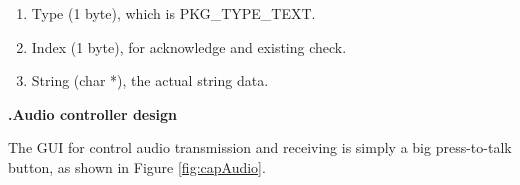 \documentclass[a4paper,notitlepage,10pt]{report}
\newcommand{\tab}{\hspace{0.75cm}}
\newcommand{\fontSubHeading}{\fontsize{10pt}{11pt}\selectfont}
\newcounter{sections}
\newcounter{subsections}[sections]
\begin{document}
\begin{multicols}{2}
\begin{enumerate}[label={\arabic*)},align=left,leftmargin=0.5cm,labelwidth=!,topsep=0pt,partopsep=0pt,parsep=0pt,itemsep=0pt]
\item Type (1 byte), which is PKG\_TYPE\_TEXT.
\item Index (1 byte), for acknowledge and existing check.
\item String (char *), the actual string data.
\end{enumerate}
\vspace{6pt}

\fontSubHeading
{}
\textbf{\thesections.\thesubsections\tab Audio controller design}
\vspace{6pt}

The GUI for control audio transmission and receiving is simply a big press-to-talk button, as shown in Figure \ref{fig:capAudio}.
\vspace{6pt}


\end{multicols}
\end{document}
